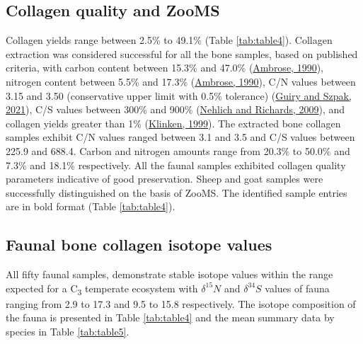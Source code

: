 \documentclass[preprint, 3p, authoryear]{elsarticle} %
\begin{document}
\hypertarget{collagen-quality-and-zooms}{%
\subsection{Collagen quality and ZooMS}\label{collagen-quality-and-zooms}}

Collagen yields range between 2.5\% to 49.1\% (Table \ref{tab:table4}). Collagen extraction was considered successful for all the bone samples, based on published criteria, with carbon content between 15.3\% and 47.0\% (\protect\hyperlink{ref-ambrose90}{Ambrose, 1990}), nitrogen content between 5.5\% and 17.3\% (\protect\hyperlink{ref-ambrose90}{Ambrose, 1990}), C/N values between 3.15 and 3.50 (conservative upper limit with 0.5\% tolerance) (\protect\hyperlink{ref-guiry_szpak21}{Guiry and Szpak, 2021}), C/S values between 300\% and 900\% (\protect\hyperlink{ref-nehlich_richards09}{Nehlich and Richards, 2009}), and collagen yields greater than 1\% (\protect\hyperlink{ref-vanklinken99}{Klinken, 1999}). The extracted bone collagen samples exhibit C/N values ranged between 3.1 and 3.5 and C/S values between 225.9 and 688.4. Carbon and nitrogen amounts range from 20.3\% to 50.0\% and 7.3\% and 18.1\% respectively. All the faunal samples exhibited collagen quality parameters indicative of good preservation.
Sheep and goat samples were successfully distinguished on the basis of ZooMS. The identified sample entries are in bold format (Table \ref{tab:table4}).

\hypertarget{faunal-bone-collagen-isotope-values}{%
\subsection{Faunal bone collagen isotope values}\label{faunal-bone-collagen-isotope-values}}

All fifty faunal samples, demonstrate stable isotope values within the range expected for a C\textsubscript{3} temperate ecosystem with \(\delta ^{15}N\) and \(\delta ^{34}S\) values of fauna ranging from 2.9 \text{\textperthousand} to 17.3 \text{\textperthousand} and 9.5 \text{\textperthousand} to 15.8 \text{\textperthousand} respectively. The isotope composition of the fauna is presented in Table \ref{tab:table4} and the mean summary data by species in Table \ref{tab:table5}.






\begingroup\fontsize{7.5}{9.5}\selectfont
\end{document}
